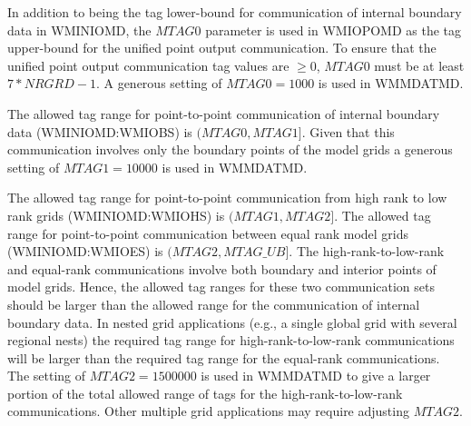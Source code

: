 In addition to being the tag lower-bound for communication of internal boundary data in
{\file WMINIOMD}, the $MTAG0$ parameter is used in {\file WMIOPOMD} as the tag upper-bound
for the unified point output communication.  To ensure that the unified point
output communication tag values are $\geq 0$, $MTAG0$ must be at least $7*NRGRD-1$.
A generous setting of $MTAG0 = 1000$ is used in {\file WMMDATMD}.

The allowed tag range for point-to-point communication of internal boundary data
({\file WMINIOMD:WMIOBS}) is $(MTAG0,MTAG1]$.
Given that this communication involves only the boundary points of the model
grids a generous setting of $MTAG1 = 10000$ is used in {\file WMMDATMD}.

The allowed tag range for point-to-point communication from high rank to low rank grids
({\file WMINIOMD:WMIOHS}) is $(MTAG1,MTAG2]$.
The allowed tag range for point-to-point communication between equal rank model grids
({\file WMINIOMD:WMIOES}) is $(MTAG2,MTAG\_UB]$.
The high-rank-to-low-rank and equal-rank communications involve both
boundary and interior points of model grids.
Hence, the allowed tag ranges for these two communication sets should be
larger than the allowed range for the communication of internal boundary data.
In nested grid applications (e.g., a single global grid with several regional nests)
the required tag range for high-rank-to-low-rank communications will be larger
than the required tag range for the equal-rank communications.
The setting of $MTAG2 = 1500000$ is used in {\file WMMDATMD} to give a larger portion
of the total allowed range of tags for the high-rank-to-low-rank communications.
Other multiple grid applications may require adjusting $MTAG2$.


